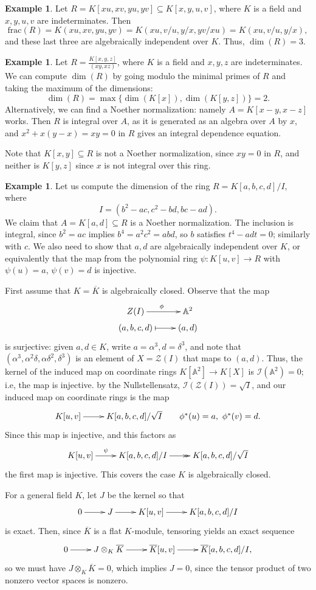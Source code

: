 \documentclass{amsart}[12pt]
\newcommand{\cZ}{\mathcal{Z}}
\newcommand{\cI}{\mathcal{I}}
\numberwithin{equation}{section}
\theoremstyle{plain} %
\theoremstyle{definition}
\newtheorem{ex}[equation]{Example}
\theoremstyle{remark}
\begin{document}
\begin{ex} Let $R=K[xu,xv,yu,yv]\subseteq K[x,y,u,v]$, where $K$ is a field and $x,y,u,v$ are indeterminates. Then \[\mathrm{frac}(R)=K(xu,xv,yu,yv) = K(xu,v/u,y/x,yv/xu) = K(xu,v/u,y/x), \] and these last three are algebraically independent over $K$. Thus, $\dim(R)=3$.
\end{ex}

\begin{ex} Let $\displaystyle R=\frac{K[x,y,z]}{(xy,xz)}$, where $K$ is a field and $x,y,z$ are indeterminates.  We can compute $\dim(R)$ by going modulo the minimal primes of $R$ and taking the maximum of the dimensions: 
\[\dim(R)=\max\{ \dim(K[x]), \dim(K[y,z])\} = 2.\]
Alternatively, we can find a Noether normalization: namely $A=K[x-y,x-z]$ works.  Then $R$ is integral over $A$, as it is generated as an algebra over $A$ by $x$, and $x^2 + x(y-x) = xy =0$ in $R$ gives an integral dependence equation.

Note that $K[x,y] \subseteq R$ is not a Noether normalization, since $xy=0$ in $R$, and neither is $K[y,z]$ since $x$ is not integral over this ring.
\end{ex}

\begin{ex}
Let us compute the dimension of the ring $R=K[a,b,c,d]/I$, where \[I=(b^2-ac,c^2-bd,bc-ad).\] We claim that $A=K[a,d]\subseteq R$ is a Noether normalization. The inclusion is integral, since $b^2=ac$ implies $b^4=a^2 c^2 = abd$, so $b$ satisfies $t^4 - ad t =0$; similarly with $c$. We also need to show that $a,d$ are algebraically independent over $K$, or equivalently that the map from the polynomial ring $\psi : K[u,v] \to R$ with $\psi(u)=a$, $\psi(v)=d$ is injective.

First assume that $K=\overline{K}$ is algebraically closed. Observe that the map 
\[\xymatrix@R=1mm{ Z(I) \ar[r]^{\phi} & \mathbb{A}^2 \\
(a,b,c,d) \ar@{|->}[r] & (a,d) }\]
is surjective: given $a,d\in K$, write $a=\alpha^3, d=\delta^3$, and note that $(\alpha^3, \alpha^2 \delta, \alpha \delta^2, \delta^3)$ is an element of $X=\cZ(I)$ that maps to $(a,d)$. Thus, the kernel of the induced map on coordinate rings $K[\mathbb{A}^2] \to K[X]$ is $\cI(\mathbb{A}^2) = 0$; i.e, the map is injective. by the Nullstellensatz, $\mathcal{I}(\cZ(I))= \sqrt{I}$, and our induced map on coordinate rings is the map
\[\xymatrix@R=1mm{ K[u,v] \ar[r] & K[a,b,c,d] / \sqrt{I} \qquad \phi^*(u)=a, \ \phi^*(v)=d. }\]
Since this map is injective, and this factors as
\[\xymatrix@R=1mm{ K[u,v] \ar[r]^-\psi & K[a,b,c,d] / I \ar@{->>}[r] &  K[a,b,c,d] / \sqrt{I} }\]
the first map is injective. This covers the case $K$ is algebraically closed.

For a general field $K$, let $J$ be the kernel so that 
\[\xymatrix@R=1mm{ 0  \ar[r] & J   \ar[r] & K[u,v] \ar[r] & K[a,b,c,d] / I }\]
is exact. Then, since $\overline{K}$ is a flat $K$-module, tensoring yields an exact sequence
\[\xymatrix@R=1mm{ 0  \ar[r] & J \otimes_K \overline{K}   \ar[r] & \overline{K}[u,v] \ar[r] & \overline{K}[a,b,c,d] / I ,}\]
so we must have $J \otimes_K \overline{K}=0$, which implies $J=0$, since the tensor product of two nonzero vector spaces is nonzero.
\end{ex}
\end{document}

